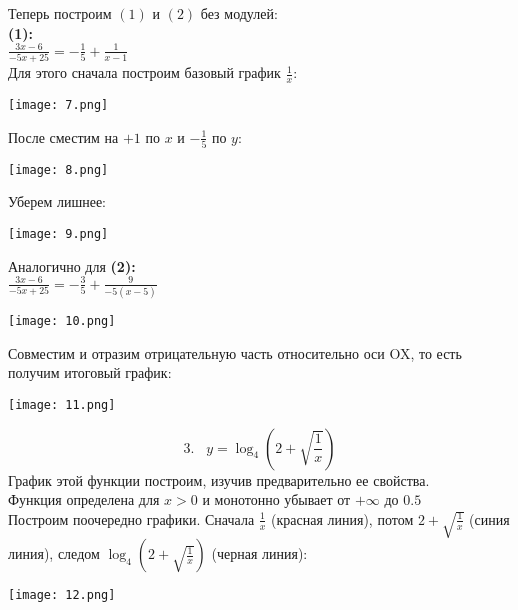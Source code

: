 \noindent Теперь построим $(1)$ и $(2)$ без модулей: \\
{\bf (1):} \\
$\frac{3x-6}{-5x+25}=-\frac{1}{5}+\frac{1}{x-1}$ \\
\noindent Для этого сначала построим базовый график $\frac{1}{x}$: 
\begin{center}\texttt{[image: 7.png]}\end{center}
После сместим на $+1$ по $x$ и $-\frac{1}{5}$ по $y$:
\begin{center}\texttt{[image: 8.png]}\end{center}
\newpage
\noindent Уберем лишнее:
\begin{center}\texttt{[image: 9.png]}\end{center}
Аналогично для {\bf (2):}  \\
$\frac{3x-6}{-5x+25}=-\frac{3}{5}+\frac{9}{-5(x-5)}$ \\
\begin{center}\texttt{[image: 10.png]}\end{center}
\newpage
\noindent Совместим и отразим отрицательную часть относительно оси OX, то есть получим итоговый график:
\begin{center}\texttt{[image: 11.png]}\end{center}
\[3. \hspace{10pt} y =\log_4{\left(2+\sqrt{\frac{1}{x}}\right)}\]
График этой функции построим, изучив предварительно ее свойства. \\
Функция определена для $x>0$ и монотонно убывает от $+\infty$ до $0.5$ \\
Построим поочередно графики. Сначала $\frac{1}{x}$ (красная линия), потом  $2+\sqrt{\frac{1}{x}}$ (синия линия), следом     $\log_4{\left(2+\sqrt{\frac{1}{x}}\right)}$ (черная линия):
\begin{center}\texttt{[image: 12.png]}\end{center}
